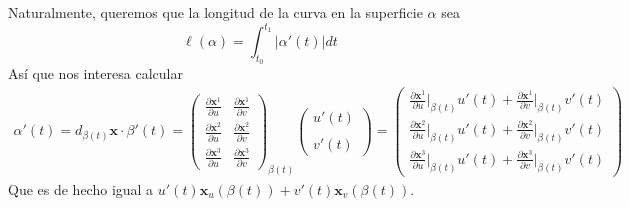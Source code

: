 \documentclass[spanish]{book}
\theoremstyle{definition}
\begin{document}
Naturalmente, queremos que la longitud de la curva en la superficie $\alpha$ sea
\[\ell(\alpha)=\int_{t_0}^{t_1}|\alpha'(t)|dt\]
Así que nos interesa calcular
\begin{align*}
	\alpha'(t)=d_{\beta(t)}\mathbf{x}\cdot\beta'(t)
	=\begin{pmatrix}\frac{\partial\mathbf{x}^1}{\partial u}&\frac{\partial\mathbf{x}^1}{\partial v}\\\frac{\partial\mathbf{x}^2}{\partial u}&\frac{\partial\mathbf{x}^2}{\partial v}\\\frac{\partial\mathbf{x}^3}{\partial u}&\frac{\partial\mathbf{x}^3}{\partial v}\end{pmatrix}_{\beta(t)}\begin{pmatrix}u'(t)\\ \\v'(t)\end{pmatrix}
	=\begin{pmatrix}\frac{\partial\mathbf{x}^1}{\partial u}\big|_{\beta(t)}u'(t)+\frac{\partial\mathbf{x}^1}{\partial v}\big|_{\beta(t)}v'(t)\\\frac{\partial\mathbf{x}^2}{\partial u}\big|_{\beta(t)}u'(t)+\frac{\partial\mathbf{x}^2}{\partial v}\big|_{\beta(t)}v'(t)\\\frac{\partial\mathbf{x}^3}{\partial u}\big|_{\beta(t)}u'(t)+\frac{\partial\mathbf{x}^3}{\partial v}\big|_{\beta(t)}v'(t)\end{pmatrix}
\end{align*}
Que es de hecho igual a $u'(t)\mathbf{x}_u(\beta(t))+v'(t)\mathbf{x}_v(\beta(t))$.
\end{document}
